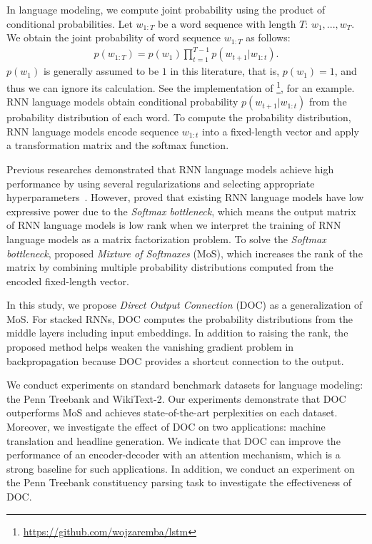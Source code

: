 \documentclass[11pt,a4paper]{article}
\begin{document}
In language modeling, we compute joint probability using the product of conditional probabilities.
Let $w_{1:T}$ be a word sequence with length $T$: $w_1, ..., w_T$.
We obtain the joint probability of word sequence $w_{1:T}$ as follows:
\begin{align}
  p(w_{1:T}) = p(w_1)\prod_{t=1}^{T-1} p(w_{t+1} | w_{1:t}). \label{eq:def_lm}
\end{align}
$p(w_1)$ is generally assumed to be $1$ in this literature, that is, $p(w_1)\!=\!1$, and thus we can ignore its calculation.
See the implementation of \footnote{\href{https://github.com/wojzaremba/lstm}{{https://github.com/wojzaremba/lstm}}}, for an example.
RNN language models obtain conditional probability $p(w_{t+1} | w_{1:t})$ from the probability distribution of each word.
To compute the probability distribution, RNN language models encode sequence $w_{1:t}$ into a fixed-length vector and apply a transformation matrix and the softmax function.


Previous researches demonstrated that RNN language models achieve high performance by using several regularizations and selecting appropriate hyperparameters~\cite{DBLP:journals/corr/MelisDB17,merityRegOpt}.
However,  proved that existing RNN language models have low expressive power due to the \textit{Softmax bottleneck}, which means the output matrix of RNN language models is low rank when we interpret the training of RNN language models as a matrix factorization problem.
To solve the \textit{Softmax bottleneck},  proposed \textit{Mixture of Softmaxes} (MoS), which increases the rank of the matrix by combining multiple probability distributions computed from the encoded fixed-length vector.


In this study, we propose \textit{Direct Output Connection} (DOC) as a generalization of MoS.
For stacked RNNs, DOC computes the probability distributions from the middle layers including input embeddings.
In addition to raising the rank, the proposed method helps weaken the vanishing gradient problem in backpropagation because DOC provides a shortcut connection to the output.


We conduct experiments on standard benchmark datasets for language modeling: the Penn Treebank and WikiText-2.
Our experiments demonstrate that DOC outperforms MoS and achieves state-of-the-art perplexities on each dataset.
Moreover, we investigate the effect of DOC on two applications: machine translation and headline generation.
We indicate that DOC can improve the performance of an encoder-decoder with an attention mechanism, which is a strong baseline for such applications.
In addition, we conduct an experiment on the Penn Treebank constituency parsing task to investigate the effectiveness of DOC.
\end{document}
